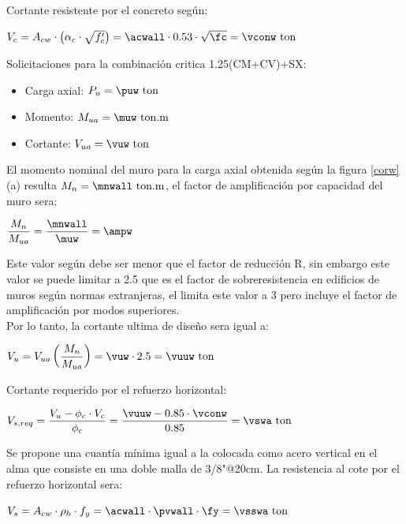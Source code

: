 Cortante resistente por el concreto según:
\begin{center}
$V_{c}=A_{c w} \cdot\left(\alpha_{c} \cdot \sqrt{f_{c}^{\prime}}\right)=\acwall \cdot 0.53 \cdot \sqrt{\fc}=\vconw\mathrm{~ton}$
\end{center}

\FPset{}
\FPset{}
\FPset{}
\FPset{}
Solicitaciones para la combinación critica 1.25(CM+CV)+SX:
\begin{itemize}
    \item Carga axial: $P_{u}=\puw\mathrm{~ton}$
    \item Momento: $M_{ua}=\muw\mathrm{~ton.m}$
    \item Cortante: $V_{ua}=\vuw\mathrm{~ton}$
\end{itemize}
El momento nominal del muro para la carga axial obtenida según la figura \ref{corw} (a) resulta $M_{n}=\mnwall\mathrm{~ton.m}$, el factor de amplificación por capacidad del muro sera:
\begin{center}
$\displaystyle\frac{M_{n}}{M_{u a}}=\frac{\mnwall}{\muw}=\ampw$
\end{center}
Este valor según \cite{E-060} debe ser menor que el factor de reducción R, sin embargo este valor se puede limitar a 2.5 que es el factor de sobreresistencia en edificios de muros según normas extranjeras, el \cite{ACI19} limita este valor a 3 pero incluye el factor de amplificación por modos superiores.\\
\noindent Por lo tanto, la cortante ultima de diseño sera igual a:
\begin{center}
 $\displaystyle V_{u}=V_{u a}\left(\frac{M_{n}}{M_{u a}}\right)=\vuw\cdot2.5=\vuuw\mathrm{~ton}$
\end{center}
Cortante requerido por el refuerzo horizontal:
\begin{center}
    $\displaystyle V_{s, r e q}=\frac{V_{u}-\phi_{c} \cdot V_{c}}{\phi_{c}}=\frac{\vuuw-0.85 \cdot \vconw}{0.85}=\vswa\mathrm{~ton}$
\end{center}
Se propone una cuantía mínima igual a la colocada como acero vertical en el alma que consiste en una doble malla de 3/8"@20cm.
La resistencia al cote por el refuerzo horizontal sera:
\begin{center}
    $\displaystyle V_{s}=A_{c w} \cdot \rho_{h} \cdot f_{y}=\acwall \cdot \pvwall \cdot \fy=\vsswa\mathrm{~ton}$
\end{center}
